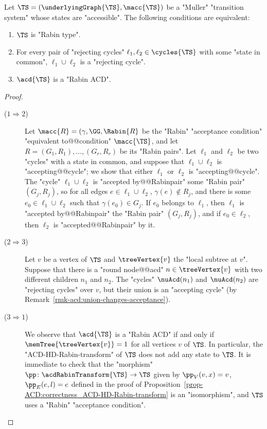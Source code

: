 \documentclass[10pt,a4paper]{amsart}
\renewcommand{\gg}{\gamma}
\begin{document}
\begin{proposition}\label{prop-typ:Rabin ACD type}
	Let $\TS = (\underlyingGraph{\TS}, \macc{\TS})$ be a "Muller" "transition system" whose states are "accessible". The following conditions are equivalent:
	\begin{enumerate}
		\item $\TS$ is "Rabin type".
		\item For every pair of "rejecting cycles" $\ell_1, \ell_2\in \cycles{\TS}$  with some "state in common",  $\ell_1\cup \ell_2$ is a "rejecting cycle".
		\item $\acd{\TS}$ is a "Rabin ACD". 
	\end{enumerate}
\end{proposition}
\begin{proof}
	\begin{description}
		\item[($1 \Rightarrow 2$)] 
		Let $\macc{R} = (\gg, \GG, \Rabin{R}$ be the "Rabin" "acceptance condition" "equivalent to@@condition" $\macc{\TS}$, and let $R = (G_1,R_1),\dots,(G_r,R_r)$ be its "Rabin pairs". Let $\ell_1$ and $\ell_2$ be two "cycles" with a state in common, and suppose that $\ell_1\cup \ell_2$ is "accepting@@cycle"; we show that either $\ell_1$ or $\ell_2$ is "accepting@@cycle". The "cycle" $\ell_1\cup \ell_2$ is "accepted by@@Rabinpair" some "Rabin pair" $(G_j,R_j)$, so for all edges $e\in \ell_1\cup \ell_2$, $\gg(e)\notin R_j$, and there is some $e_0\in \ell_1\cup \ell_2$ such that $\gg(e_0)\in G_j$. If $e_0$ belongs to $\ell_1$, then $\ell_1$ is "accepted by@@Rabinpair" the "Rabin pair" $(G_j,R_j)$, and if $e_0\in \ell_2$, then $\ell_2$ is "accepted@@Rabinpair" by it.
		
		\item[($2 \Rightarrow 3$)] Let $v$ be a vertex of $\TS$ and $\treeVertex{v}$ the "local subtree at $v$". Suppose that there is a "round node@@acd" $n\in \treeVertex{v}$ with two different children $n_1$ and $n_2$. The "cycles" $\nuAcd(n_1)$ and $\nuAcd(n_2)$ are "rejecting cycles" over $v$, but their union is an "accepting cycle" (by Remark~\ref{rmk-acd:union-changes-acceptance}).
		
		\item[($3 \Rightarrow 1$)] We observe that $\acd{\TS}$ is a "Rabin ACD" if and only if $\memTree{\treeVertex{v}} = 1$ for all vertices $v$ of $\TS$. In particular, the "ACD-HD-Rabin-transform" of $\TS$ does not add any state to $\TS$. It is immediate to check that the "morphism" $\pp\colon \acdRabinTransform{\TS} \to \TS$ given by $\pp_V(v,x)=v$, $\pp_E(e,l)=e$ defined in the proof of Proposition~\ref{prop-ACD:correctness_ACD-HD-Rabin-transform} is an "isomorphism", and $\TS$ uses a "Rabin" "acceptance condition".\qedhere
	\end{description}
\end{proof}
\end{document}
